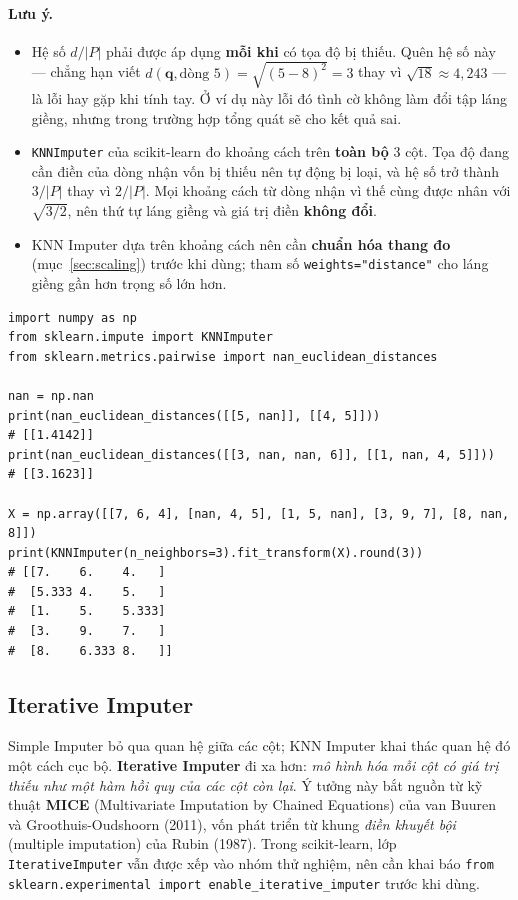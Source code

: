\paragraph{Lưu ý.}
\begin{itemize}
    \item Hệ số $d/|P|$ phải được áp dụng \textbf{mỗi khi} có tọa độ bị thiếu. Quên hệ số này --- chẳng hạn viết $d(\mathbf{q}, \text{dòng } 5) = \sqrt{(5 - 8)^2} = 3$ thay vì $\sqrt{18} \approx 4{,}243$ --- là lỗi hay gặp khi tính tay. Ở ví dụ này lỗi đó tình cờ không làm đổi tập láng giềng, nhưng trong trường hợp tổng quát sẽ cho kết quả sai.
    \item \texttt{KNNImputer} của scikit-learn đo khoảng cách trên \textbf{toàn bộ} 3 cột. Tọa độ đang cần điền của dòng nhận vốn bị thiếu nên tự động bị loại, và hệ số trở thành $3/|P|$ thay vì $2/|P|$. Mọi khoảng cách từ dòng nhận vì thế cùng được nhân với $\sqrt{3/2}$, nên thứ tự láng giềng và giá trị điền \textbf{không đổi}.
    \item KNN Imputer dựa trên khoảng cách nên cần \textbf{chuẩn hóa thang đo} (mục~\ref{sec:scaling}) trước khi dùng; tham số \texttt{weights="distance"} cho láng giềng gần hơn trọng số lớn hơn.
\end{itemize}

\begin{lstlisting}[caption={Khoảng cách nan-Euclid và KNNImputer}]
import numpy as np
from sklearn.impute import KNNImputer
from sklearn.metrics.pairwise import nan_euclidean_distances

nan = np.nan
print(nan_euclidean_distances([[5, nan]], [[4, 5]]))                  # [[1.4142]]
print(nan_euclidean_distances([[3, nan, nan, 6]], [[1, nan, 4, 5]]))  # [[3.1623]]

X = np.array([[7, 6, 4], [nan, 4, 5], [1, 5, nan], [3, 9, 7], [8, nan, 8]])
print(KNNImputer(n_neighbors=3).fit_transform(X).round(3))
# [[7.    6.    4.   ]
#  [5.333 4.    5.   ]
#  [1.    5.    5.333]
#  [3.    9.    7.   ]
#  [8.    6.333 8.   ]]
\end{lstlisting}

\subsection{Iterative Imputer}

Simple Imputer bỏ qua quan hệ giữa các cột; KNN Imputer khai thác quan hệ đó một cách cục bộ. \textbf{Iterative Imputer} đi xa hơn: \textit{mô hình hóa mỗi cột có giá trị thiếu như một hàm hồi quy của các cột còn lại}. Ý tưởng này bắt nguồn từ kỹ thuật \textbf{MICE} (Multivariate Imputation by Chained Equations) của van Buuren và Groothuis-Oudshoorn (2011), vốn phát triển từ khung \textit{điền khuyết bội} (multiple imputation) của Rubin (1987). Trong scikit-learn, lớp \texttt{IterativeImputer} vẫn được xếp vào nhóm thử nghiệm, nên cần khai báo \texttt{from sklearn.experimental import enable\_iterative\_imputer} trước khi dùng.

